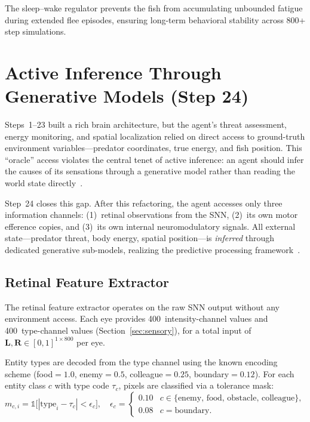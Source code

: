 \documentclass[11pt,a4paper]{article}
\begin{document}
The sleep--wake regulator prevents the fish from accumulating unbounded
fatigue during extended flee episodes, ensuring long-term behavioral
stability across 800+ step simulations.

\section{Active Inference Through Generative Models (Step 24)}\label{sec:active_inference_gm}

Steps~1--23 built a rich brain architecture, but the agent's threat assessment,
energy monitoring, and spatial localization relied on direct access to
ground-truth environment variables---predator coordinates, true energy, and
fish position.
This ``oracle'' access violates the central tenet of active inference:
an agent should infer the causes of its sensations through a generative
model rather than reading the world state
directly~\cite{friston2010,friston2017,parr2022}.

Step~24 closes this gap.
After this refactoring, the agent accesses only three information channels:
(1)~retinal observations from the SNN,
(2)~its own motor efference copies, and
(3)~its own internal neuromodulatory signals.
All external state---predator threat, body energy, spatial
position---is \emph{inferred} through dedicated generative sub-models,
realizing the predictive processing
framework~\cite{rao1999,clark2013,bogacz2017}.

\subsection{Retinal Feature Extractor}\label{sec:retinal_features}

The retinal feature extractor operates on the raw SNN output without any
environment access.
Each eye provides 400~intensity-channel values and 400~type-channel values
(Section~\ref{sec:sensory}), for a total input of $\mathbf{L}, \mathbf{R}
\in [0,1]^{1 \times 800}$ per eye.

Entity types are decoded from the type channel using the known encoding
scheme (food${=}1.0$, enemy${=}0.5$, colleague${=}0.25$, boundary${=}0.12$).
For each entity class $c$ with type code $\tau_c$, pixels are classified
via a tolerance mask:
\begin{equation}\label{eq:type_mask}
  m_{c,i} = \mathbb{1}\bigl[|\text{type}_i - \tau_c| < \epsilon_c\bigr],
  \quad \epsilon_c = \begin{cases}
    0.10 & c \in \{\text{enemy, food, obstacle, colleague}\}, \\
    0.08 & c = \text{boundary}.
  \end{cases}
\end{equation}
\end{document}
